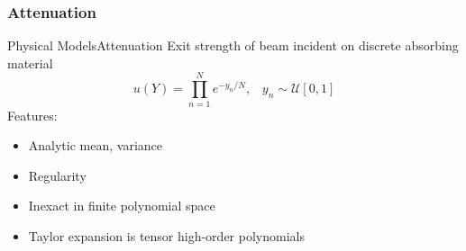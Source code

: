 \documentclass{beamer}
\begin{document}
\subsubsection{Attenuation}
\begin{frame}{Physical Models}{Attenuation}%
  Exit strength of beam incident on discrete absorbing material
  \begin{equation*}
    u(Y) = \prod_{n=1}^N e^{-y_n/N}, \hspace{10pt}y_n\sim\mathcal{U}[0,1]
  \end{equation*}
  Features:
  \begin{itemize}
    \item Analytic mean, variance
    \item Regularity
    \item Inexact in finite polynomial space
    \item Taylor expansion is tensor high-order polynomials
  \end{itemize}
\end{frame}
\end{document}
